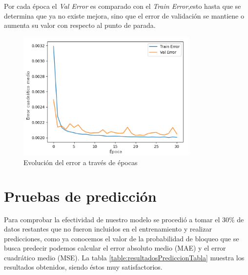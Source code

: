 Por cada época el \textit{Val Error} es comparado con el  \textit{Train Error},esto hasta que se determina que ya no existe mejora, sino que el error de validación se mantiene o aumenta su valor con respecto al punto de parada.


\begin{figure}[H]
    \centering
    \includegraphics[width=9cm]{capitulos/img/graficoErrorEs.png}
    \caption{Evolución del error a través de épocas}
    \label{fig:errorEpocas}
\end{figure}

\section{Pruebas de predicción}
Para comprobar la efectividad de nuestro modelo se procedió a tomar el 30\% de datos restantes que no fueron incluidos en el entrenamiento y realizar predicciones, como ya conocemos el valor de la probabilidad de bloqueo que se busca predecir podemos calcular el error absoluto medio (MAE) y el error cuadrático medio (MSE). La tabla \ref{table:resultadosPrediccionTabla} muestra los resultados obtenidos, siendo éstos muy satisfactorios.

